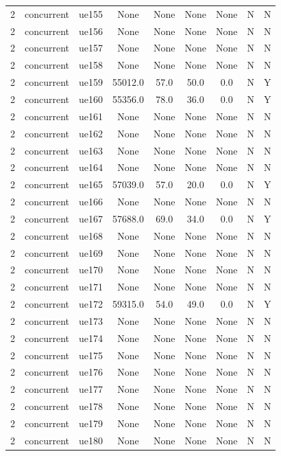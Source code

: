 \begin{table}[ht]
\begin{tabular}{|c|c|c|c|c|c|c|c|c|}
2 & concurrent & ue155 & None & None & None & None & N & N \\
2 & concurrent & ue156 & None & None & None & None & N & N \\
2 & concurrent & ue157 & None & None & None & None & N & N \\
2 & concurrent & ue158 & None & None & None & None & N & N \\
2 & concurrent & ue159 & 55012.0 & 57.0 & 50.0 & 0.0 & N & Y \\
2 & concurrent & ue160 & 55356.0 & 78.0 & 36.0 & 0.0 & N & Y \\
2 & concurrent & ue161 & None & None & None & None & N & N \\
2 & concurrent & ue162 & None & None & None & None & N & N \\
2 & concurrent & ue163 & None & None & None & None & N & N \\
2 & concurrent & ue164 & None & None & None & None & N & N \\
2 & concurrent & ue165 & 57039.0 & 57.0 & 20.0 & 0.0 & N & Y \\
2 & concurrent & ue166 & None & None & None & None & N & N \\
2 & concurrent & ue167 & 57688.0 & 69.0 & 34.0 & 0.0 & N & Y \\
2 & concurrent & ue168 & None & None & None & None & N & N \\
2 & concurrent & ue169 & None & None & None & None & N & N \\
2 & concurrent & ue170 & None & None & None & None & N & N \\
2 & concurrent & ue171 & None & None & None & None & N & N \\
2 & concurrent & ue172 & 59315.0 & 54.0 & 49.0 & 0.0 & N & Y \\
2 & concurrent & ue173 & None & None & None & None & N & N \\
2 & concurrent & ue174 & None & None & None & None & N & N \\
2 & concurrent & ue175 & None & None & None & None & N & N \\
2 & concurrent & ue176 & None & None & None & None & N & N \\
2 & concurrent & ue177 & None & None & None & None & N & N \\
2 & concurrent & ue178 & None & None & None & None & N & N \\
2 & concurrent & ue179 & None & None & None & None & N & N \\
2 & concurrent & ue180 & None & None & None & None & N & N \\

\end{tabular}
\end{table}
